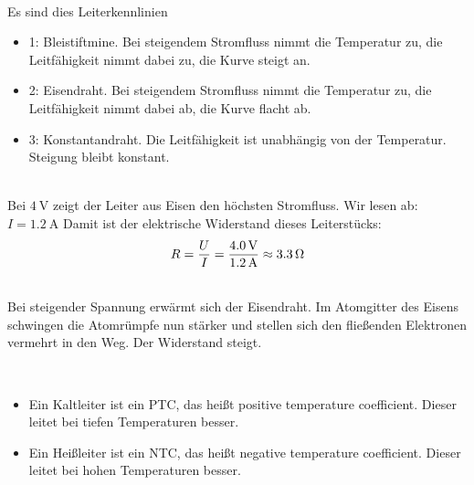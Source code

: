\documentclass[a4paper]{article}
\begin{document}
\vspace{0.5 cm}


\\
Es sind dies Leiterkennlinien

\begin{itemize}
\item 1: Bleistiftmine. Bei steigendem Stromfluss nimmt die Temperatur zu, die Leitfähigkeit nimmt dabei zu, die Kurve steigt an.
\item 2: Eisendraht. Bei steigendem Stromfluss nimmt die Temperatur zu, die Leitfähigkeit nimmt dabei ab, die Kurve flacht ab.
\item 3: Konstantandraht. Die Leitfähigkeit ist unabhängig von der Temperatur. Steigung bleibt konstant.
\end{itemize}
\vspace{0.5 cm}

\\
Bei $\SI{4}{\volt}$ zeigt der Leiter aus Eisen den höchsten Stromfluss. Wir lesen ab: $I =\SI{1,2}{\ampere}$
Damit ist der elektrische Widerstand dieses Leiterstücks:
$$R={U \over I} = {\SI{4,0}{\volt} \over \SI{1,2}{\ampere}}\approx \SI{3,3}{\ohm}$$ 
\vspace{0.5 cm}

\\
Bei steigender Spannung erwärmt sich der Eisendraht. Im Atomgitter des Eisens schwingen die Atomrümpfe nun stärker und stellen sich den fließenden Elektronen vermehrt in den Weg. Der Widerstand steigt.
\vspace{0.5 cm}

\\
\begin{itemize}
	\item Ein Kaltleiter ist ein PTC, das heißt positive temperature coefficient. Dieser leitet bei tiefen Temperaturen besser. 
	\item Ein Heißleiter ist ein NTC, das heißt negative temperature coefficient.
	Dieser leitet bei hohen Temperaturen besser.
\end{itemize}
\vspace{0.5 cm}
\end{document}
